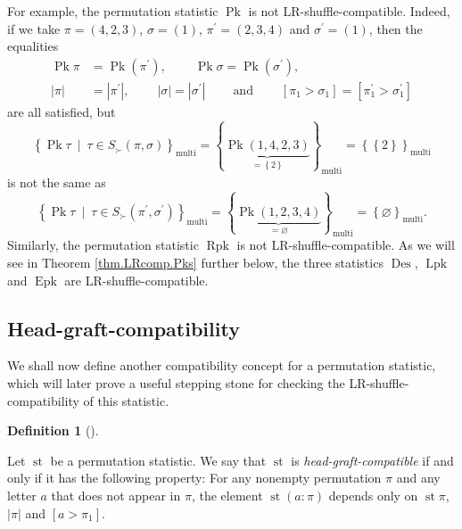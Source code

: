 \documentclass[numbers=enddot,12pt,final,onecolumn,notitlepage]{scrartcl}%
\theoremstyle{definition}
\newtheorem{defi}[theo]{Definition}
\newenvironment{definition}[1][]
{\begin{defi}[#1]\begin{leftbar}}
{\end{leftbar}\end{defi}}
\begin{document}
For example, the permutation statistic $\operatorname*{Pk}$ is not
LR-shuffle-compatible. Indeed, if we take $\pi=\left(  4,2,3\right)  $,
$\sigma=\left(  1\right)  $, $\pi^{\prime}=\left(  2,3,4\right)  $ and
$\sigma^{\prime}=\left(  1\right)  $, then the equalities%
\begin{align*}
\operatorname*{Pk} \pi &  =\operatorname*{Pk}\left(
\pi^{\prime}\right)  ,\ \ \ \ \ \ \ \ \ \ \operatorname*{Pk} \sigma
=\operatorname*{Pk}\left(  \sigma^{\prime}\right)  ,\\
\left\vert \pi\right\vert  &  =\left\vert \pi^{\prime}\right\vert
,\ \ \ \ \ \ \ \ \ \ \left\vert \sigma\right\vert =\left\vert \sigma^{\prime
}\right\vert \ \ \ \ \ \ \ \ \ \ \text{and}\ \ \ \ \ \ \ \ \ \ \left[  \pi
_{1}>\sigma_{1}\right]  =\left[  \pi_{1}^{\prime}>\sigma_{1}^{\prime}\right]
\end{align*}
are all satisfied, but%
\[
\left\{  \operatorname*{Pk} \tau \ \mid\ \tau\in S_{\succ
}\left(  \pi,\sigma\right)  \right\}  _{\operatorname*{multi}}=\left\{
\underbrace{\operatorname*{Pk}\left(  1,4,2,3\right)  }_{=\left\{  2\right\}
}\right\}  _{\operatorname*{multi}}=\left\{  \left\{  2\right\}  \right\}
_{\operatorname*{multi}}%
\]
is not the same as%
\[
\left\{  \operatorname*{Pk} \tau \ \mid\ \tau\in S_{\succ
}\left(  \pi^{\prime},\sigma^{\prime}\right)  \right\}
_{\operatorname*{multi}}=\left\{  \underbrace{\operatorname*{Pk}\left(
1,2,3,4\right)  }_{=\varnothing}\right\}  _{\operatorname*{multi}}=\left\{
\varnothing\right\}  _{\operatorname*{multi}}.
\]
Similarly, the permutation statistic $\operatorname*{Rpk}$ is not
LR-shuffle-compatible. As we will see in Theorem \ref{thm.LRcomp.Pks} further
below, the three statistics $\operatorname{Des}$, $\operatorname*{Lpk}$ and
$\operatorname{Epk}$ are LR-shuffle-compatible.

\subsection{Head-graft-compatibility}

We shall now define another compatibility concept for a permutation statistic,
which will later prove a useful stepping stone for checking the
LR-shuffle-compatibility of this statistic.

\begin{definition}
\label{def.head-comp}Let $\operatorname{st}$ be a permutation statistic. We
say that $\operatorname{st}$ is \textit{head-graft-compatible} if and only if
it has the following property: For any nonempty permutation $\pi$ and any
letter $a$ that does not appear in $\pi$, the element $\operatorname{st}
\left(  a:\pi\right)  $ depends only on $\operatorname{st} \pi 
$, $\left\vert \pi\right\vert $ and $\left[  a>\pi_{1}\right]  $.
\end{definition}
\end{document}
